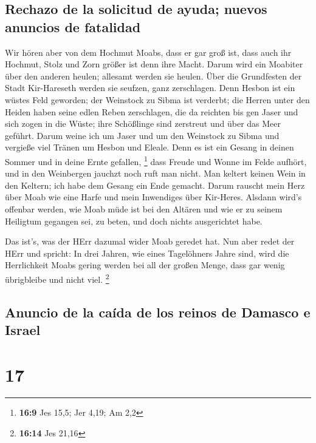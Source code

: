 \hypertarget{rechazo-de-la-solicitud-de-ayuda-nuevos-anuncios-de-fatalidad}{%
\subsection{Rechazo de la solicitud de ayuda; nuevos anuncios de
fatalidad}\label{rechazo-de-la-solicitud-de-ayuda-nuevos-anuncios-de-fatalidad}}

 Wir hören aber von dem Hochmut Moabs, dass er gar groß
ist, dass auch ihr Hochmut, Stolz und Zorn größer ist denn ihre Macht.
 Darum wird ein Moabiter über den anderen heulen; allesamt
werden sie heulen. Über die Grundfesten der Stadt Kir-Hareseth werden
sie seufzen, ganz zerschlagen.  Denn Hesbon ist ein wüstes
Feld geworden; der Weinstock zu Sibma ist verderbt; die Herren unter den
Heiden haben seine edlen Reben zerschlagen, die da reichten bis gen
Jaser und sich zogen in die Wüste; ihre Schößlinge sind zerstreut und
über das Meer geführt.  Darum weine ich um Jaser und um
den Weinstock zu Sibma und vergieße viel Tränen um Hesbon und Eleale.
Denn es ist ein Gesang in deinen Sommer und in deine Ernte gefallen,
\footnote{\textbf{16:9} Jes 15,5; Jer 4,19; Am 2,2}  dass
Freude und Wonne im Felde aufhört, und in den Weinbergen jauchzt noch
ruft man nicht. Man keltert keinen Wein in den Keltern; ich habe dem
Gesang ein Ende gemacht.  Darum rauscht mein Herz über
Moab wie eine Harfe und mein Inwendiges über Kir-Heres. 
Alsdann wird's offenbar werden, wie Moab müde ist bei den Altären und
wie er zu seinem Heiligtum gegangen sei, zu beten, und doch nichts
ausgerichtet habe.

 Das ist's, was der HErr dazumal wider Moab geredet hat.
 Nun aber redet der HErr und spricht: In drei Jahren, wie
eines Tagelöhners Jahre sind, wird die Herrlichkeit Moabs gering werden
bei all der großen Menge, dass gar wenig übrigbleibe und nicht viel.
\footnote{\textbf{16:14} Jes 21,16}

\hypertarget{anuncio-de-la-cauxedda-de-los-reinos-de-damasco-e-israel}{%
\subsection{Anuncio de la caída de los reinos de Damasco e
Israel}\label{anuncio-de-la-cauxedda-de-los-reinos-de-damasco-e-israel}}

\hypertarget{section-16}{%
\section{17}\label{section-16}}

